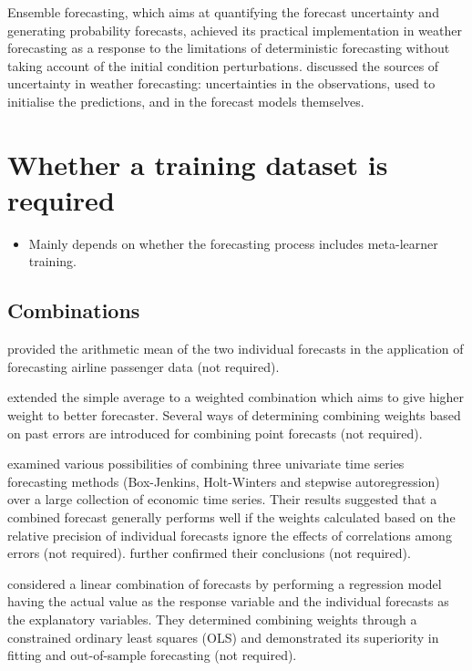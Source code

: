 \documentclass[11pt]{article}
\begin{document}
Ensemble forecasting, which aims at quantifying the forecast uncertainty and generating probability forecasts, achieved its practical implementation in weather forecasting as a response to the limitations of deterministic forecasting without taking account of the initial condition perturbations. \cite{leutbecher2008ensemble} discussed the sources of uncertainty in weather forecasting: uncertainties in the observations, used to initialise the predictions, and in the forecast models themselves.


\section{Whether a training dataset is required}
\begin{itemize}
\item Mainly depends on whether the forecasting process includes meta-learner training.
\end{itemize}

\subsection{Combinations}

\cite{barnard1963new} provided the arithmetic mean of the two individual forecasts in the application of forecasting airline passenger data (not required).

\cite{bates1969combination} extended the simple average to a weighted combination which aims to give higher weight to better forecaster. Several ways of determining combining weights based on past errors are introduced for combining point forecasts (not required).

\cite{newbold1974experience} examined various possibilities of combining three univariate time series forecasting methods (Box-Jenkins, Holt-Winters and stepwise autoregression) over a large collection of economic time series. Their results suggested that a combined forecast generally performs well if the weights calculated based on the relative precision of individual forecasts ignore the effects of correlations among errors (not required). \cite{winkler1983combination} further confirmed their conclusions (not required).

\cite{granger1984improved} considered a linear combination of forecasts by performing a regression model having the actual value as the response variable and the individual forecasts as the explanatory variables. They determined combining weights through a constrained ordinary least squares (OLS) and demonstrated its superiority in fitting and out-of-sample forecasting (not required).
\end{document}
